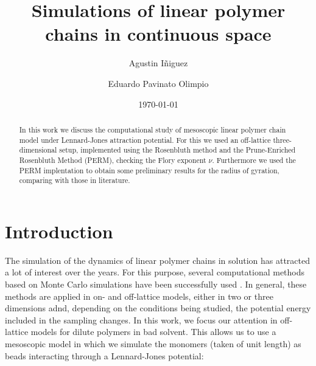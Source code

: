 \documentclass[aps,prl,reprint,groupedaddress]{revtex4-1}
\begin{document}
\title{Simulations of linear polymer chains in continuous space}

\author{Agustin I\~niguez}
\author{Eduardo Pavinato Olimpio}


\date{\today}

\begin{abstract}
	In this work we discuss the computational study of mesoscopic linear polymer chain model under Lennard-Jones attraction potential. For this we used an off-lattice three-dimensional setup, implemented using the Rosenbluth method and the Prune-Enriched Rosenbluth Method (PERM), checking the Flory exponent $\nu$. Furthermore we used the PERM implentation to obtain some preliminary results for the radius of gyration, comparing with those in literature.
\end{abstract}

\maketitle

\section{Introduction}
The simulation of the dynamics of linear polymer chains in solution has attracted a lot of interest over the years. For this purpose, several computational methods based on Monte Carlo simulations have been successfully used \cite{mc_polymer_review}. In general, these methods are applied in on- and off-lattice models, either in two or three dimensions adnd, depending on the conditions being studied, the potential energy included in the sampling changes. In this work, we focus our attention in off-lattice models for dilute polymers in bad solvent. This allows us to use a mesoscopic model in which we simulate the monomers (taken of unit length) as beads interacting through a Lennard-Jones potential:
\end{document}
